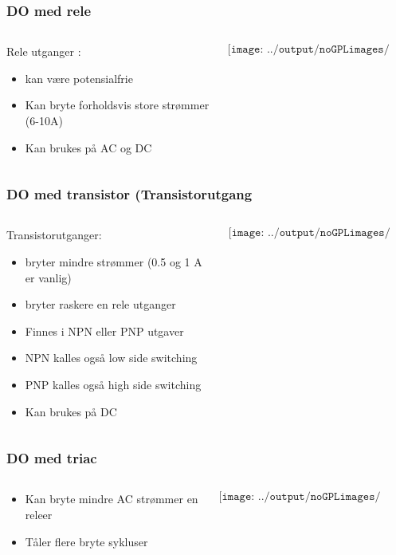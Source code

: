 \documentclass[aspectratio=169,xcolor=dvipsnames]{beamer}
\begin{document}
\begin{frame}
	\frametitle{DO med rele}
	\begin{columns}
		\begin{column}{0.5\textwidth}
			Rele utganger :
			\begin{itemize}
				\item kan være potensialfrie
				\item Kan bryte forholdsvis store strømmer (6-10A)
				\item Kan brukes på AC og DC
			\end{itemize}

			
		\end{column}

		\begin{column}{0.5\textwidth}
	$$\texttt{[image: ../output/noGPLimages/pls03.png]}$$
		\end{column}
	\end{columns}
\end{frame}

\begin{frame}
	\frametitle{DO med transistor (Transistorutgang}
	\begin{columns}
		\begin{column}{0.5\textwidth}
			Transistorutganger:
			\begin{itemize}
				\item bryter mindre strømmer (0.5 og 1 A er vanlig)
				\item bryter raskere en rele utganger
				\item Finnes i NPN eller PNP utgaver
				\item NPN kalles også low side switching
				\item PNP kalles også high side switching
				\item Kan brukes på DC
			\end{itemize}

			
		\end{column}

		\begin{column}{0.5\textwidth}
	$$\texttt{[image: ../output/noGPLimages/pls04.png]}$$
		\end{column}
	\end{columns}
\end{frame}

\begin{frame}
	\frametitle{DO med triac}
	\begin{columns}
		\begin{column}{0.5\textwidth}
			\begin{itemize}
				\item Kan bryte mindre AC strømmer en releer
				\item Tåler flere bryte sykluser
			\end{itemize}

			
		\end{column}

		\begin{column}{0.5\textwidth}
	$$\texttt{[image: ../output/noGPLimages/pls05.png]}$$
		\end{column}
	\end{columns}
\end{frame}
\end{document}
